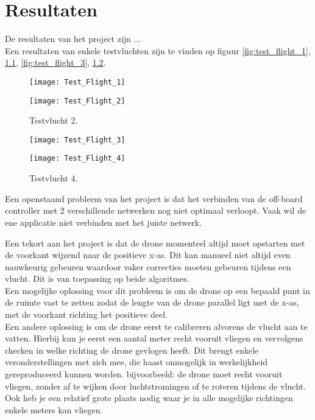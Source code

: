 \chapter{Resultaten}
De resultaten van het project zijn ...\\

Een resultaten van enkele testvluchten zijn te vinden op figuur \ref{fig:test_flight_1}, \ref{fig:test_flight_2}, \ref{fig:test_flight_3}, \ref{fig:test_flight_4}.\\
\begin{figure}[p]
	\centering
	\texttt{[image: Test\_Flight\_1]}
	\caption[Testvlucht 1]{Testvlucht 1.}
	\label{fig:test_flight_1}
	
	\centering
	\texttt{[image: Test\_Flight\_2]}
	\caption[Testvlucht 2]{Testvlucht 2.}
	\label{fig:test_flight_2}
\end{figure}
\begin{figure}[p]
	\centering
	\texttt{[image: Test\_Flight\_3]}
	\caption[Testvlucht 3]{Testvlucht 3.}
	\label{fig:test_flight_3}

	\texttt{[image: Test\_Flight\_4]}
	\caption[Testvlucht 4]{Testvlucht 4.}
	\label{fig:test_flight_4}
\end{figure}

Een openstaand probleem van het project is dat het verbinden van de off-board controller met 2 verschillende netwerken nog niet optimaal verloopt. Vaak wil de ene applicatie niet verbinden met het juiste netwerk.

Een tekort aan het project is dat de drone momenteel altijd moet opstarten met de voorkant wijzend naar de positieve x-as. Dit kan manueel niet altijd even nauwkeurig gebeuren waardoor vaker correcties moeten gebeuren tijdens een vlucht. Dit is van toepassing op beide algoritmes.\\
Een mogelijke oplossing voor dit probleem is om de drone op een bepaald punt in de ruimte vast te zetten zodat de lengte van de drone parallel ligt met de x-as, met de voorkant richting het positieve deel.\\
Een andere oplossing is om de drone eerst te calibreren alvorens de vlucht aan te vatten.
Hierbij kun je eerst een aantal meter recht vooruit vliegen en vervolgens checken in welke richting de drone gevlogen heeft.
Dit brengt enkele veronderstellingen met zich mee, die haast onmogelijk in werkelijkheid gereproduceerd kunnen worden. bijvoorbeeld: de drone moet recht vooruit vliegen, zonder af te wijken door luchtstromingen of te roteren tijdens de vlucht.
Ook heb je een relatief grote plaats nodig waar je in alle mogelijke richtingen enkele meters kan vliegen.\\


